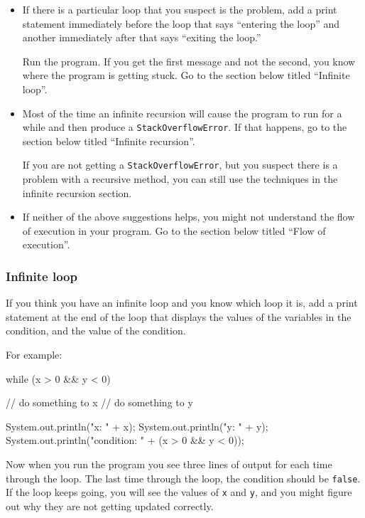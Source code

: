 \documentclass[12pt]{book}
\theoremstyle{exercise}
\newcommand{\java}[1]{\verb"#1"}
\begin{document}
\begin{itemize}

\item If there is a particular loop that you suspect is the problem, add a print statement immediately before the loop that says ``entering the loop'' and another immediately after that says ``exiting the loop.''

Run the program.
If you get the first message and not the second, you know where the program is getting stuck.
Go to the section below titled ``Infinite loop''.

\item Most of the time an infinite recursion will cause the program to run for a while and then produce a \java{StackOverflowError}.
If that happens, go to the section below titled ``Infinite recursion''.

If you are not getting a \java{StackOverflowError}, but you suspect there is a problem with a recursive method, you can still use the techniques in the infinite recursion section.

\item If neither of the above suggestions helps, you might not understand the flow of execution in your program.
Go to the section below titled ``Flow of execution''.

\end{itemize}


\subsubsection*{Infinite loop}

If you think you have an infinite loop and you know which loop it is, add a print statement at the end of the loop that displays the values of the variables in the condition, and the value of the condition.

For example:

\begin{code}
    while (x > 0 && y < 0) {
        // do something to x
        // do something to y

        System.out.println("x: " + x);
        System.out.println("y: " + y);
        System.out.println("condition: " + (x > 0 && y < 0));
    }
\end{code}

Now when you run the program you see three lines of output for each time through the loop.
The last time through the loop, the condition should be \java{false}.
If the loop keeps going, you will see the values of \java{x} and \java{y}, and you might figure out why they are not getting updated correctly.
\end{document}
